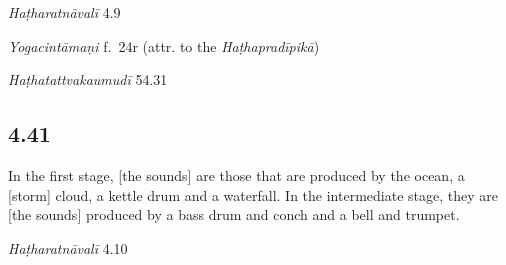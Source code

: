 \begin{ekdosis}

\begin{testimonia}[hp04_040]
\emph{Haṭharatnāvalī} 4.9
\begin{versinnote}
\end{versinnote}

\emph{Yogacintāmaṇi} f.~24r (attr. to the \emph{Haṭhapradīpikā})
\begin{versinnote}
\end{versinnote}

\emph{Haṭhatattvakaumudī} 54.31
\begin{versinnote}
\end{versinnote}
\end{testimonia}


\subsection*{4.41}
\begin{translation}[hp04_041]
In the first stage, [the sounds] are those that are produced by the ocean, a [storm] cloud, a kettle drum and a waterfall. In the intermediate stage, they are [the sounds] produced by a bass drum and conch and a bell and trumpet.
\end{translation}


\begin{testimonia}[hp04_041]
\emph{Haṭharatnāvalī} 4.10
\begin{versinnote}
\end{versinnote}


\end{testimonia}
\end{ekdosis}
